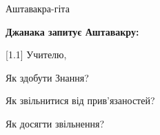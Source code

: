 \thispagestyle{empty}
\vspace*{\fill}
\begin{LARGE}
\begin{center}
Аштавакра-гіта
\end{center}
\end{LARGE}

\vspace*{\fill}
\textbf{Джанака запитує Аштавакру:}

[1.1] Учителю,

Як здобути Знання?

Як звільнитися від прив'язаностей?

Як досягти звільнення?
